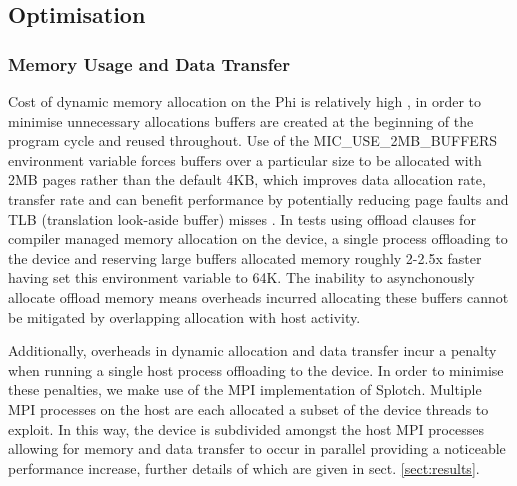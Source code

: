 \documentclass[runningheads,a4paper]{llncs}
\begin{document}



\subsection{Optimisation}
\label{sect:micoptimisation}


\subsubsection{Memory Usage and Data Transfer}
\label{sect:memusage}

Cost of dynamic memory allocation on the Phi is relatively high \cite{mem_alloc}, in order to minimise unnecessary allocations 
buffers are created at the beginning of the program cycle and reused throughout. Use of the MIC\_USE\_2MB\_BUFFERS 
environment variable forces buffers over a particular size to be allocated with 2MB pages rather than the default 4KB, 
which improves data allocation rate, transfer rate and can benefit performance by potentially reducing page 
faults and TLB (translation look-aside buffer) misses \cite{env_var_buf}. In tests using offload clauses for compiler 
managed memory allocation on the device, a single process offloading to the device and reserving large buffers allocated 
memory roughly 2-2.5x faster having set this environment variable to 64K. The inability to asynchonously allocate offload 
memory means overheads incurred allocating these buffers cannot be mitigated by overlapping allocation with host activity.


Additionally, overheads in dynamic allocation and data transfer incur a penalty when running a single host process 
offloading to the device. In order to minimise these penalties, we make use of the MPI implementation of Splotch. 
Multiple MPI processes on the host are each allocated a subset of the device threads to exploit. In this way, the device is 
subdivided amongst the host MPI processes allowing for memory and data transfer to occur in parallel providing a noticeable 
performance increase, further details of which are given in sect. \ref{sect:results}.
\end{document}
